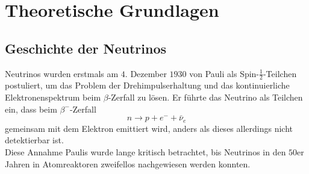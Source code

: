 \chapter{Theoretische Grundlagen}
\label{chap:theorie}


\section{Geschichte der Neutrinos}
\label{sec:neutrinogeschichte}

Neutrinos wurden erstmals am $4.$ Dezember $1930$ von Pauli als Spin-$\frac{1}{2}$-Teilchen postuliert, um das Problem der Drehimpulserhaltung und das kontinuierliche Elektronenspektrum beim $\beta$-Zerfall zu lösen. %
Er führte das Neutrino als Teilchen ein, dass beim $\beta^-$-Zerfall
\begin{equation*}
    n \rightarrow p + e^- + \bar{\nu}_e
\end{equation*}
gemeinsam mit dem Elektron emittiert wird, anders als dieses allerdings nicht detektierbar ist. \\
Diese Annahme Paulis wurde lange kritisch betrachtet, bis Neutrinos in den $50$er Jahren in Atomreaktoren zweifellos nachgewiesen werden konnten. %

